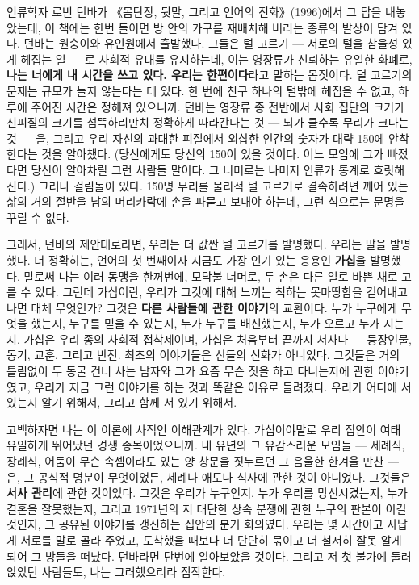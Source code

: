 인류학자 로빈 던바가 《몸단장, 뒷말, 그리고 언어의 진화》(1996)에서 그 답을 내놓았는데, 이 책에는 한번 들이면 방 안의 가구를 재배치해 버리는 종류의 발상이 담겨 있다. 던바는 원숭이와 유인원에서 출발했다. 그들은 털 고르기 — 서로의 털을 참을성 있게 헤집는 일 — 로 사회적 유대를 유지하는데, 이는 영장류가 신뢰하는 유일한 화폐로, \textbf{나는 너에게 내 시간을 쓰고 있다. 우리는 한편이다}라고 말하는 몸짓이다. 털 고르기의 문제는 규모가 늘지 않는다는 데 있다. 한 번에 친구 하나의 털밖에 헤집을 수 없고, 하루에 주어진 시간은 정해져 있으니까. 던바는 영장류 종 전반에서 사회 집단의 크기가 신피질의 크기를 섬뜩하리만치 정확하게 따라간다는 것 — 뇌가 클수록 무리가 크다는 것 — 을, 그리고 우리 자신의 과대한 피질에서 외삽한 인간의 숫자가 대략 150에 안착한다는 것을 알아챘다. (당신에게도 당신의 150이 있을 것이다. 어느 모임에 그가 빠졌다면 당신이 알아차릴 그런 사람들 말이다. 그 너머로는 나머지 인류가 통계로 흐릿해진다.) 그러나 걸림돌이 있다. 150명 무리를 물리적 털 고르기로 결속하려면 깨어 있는 삶의 거의 절반을 남의 머리카락에 손을 파묻고 보내야 하는데, 그런 식으로는 문명을 꾸릴 수 없다.

그래서, 던바의 제안대로라면, 우리는 더 값싼 털 고르기를 발명했다. 우리는 말을 발명했다. 더 정확히는, 언어의 첫 번째이자 지금도 가장 인기 있는 응용인 \textbf{가십}을 발명했다. 말로써 나는 여러 동맹을 한꺼번에, 모닥불 너머로, 두 손은 다른 일로 바쁜 채로 고를 수 있다. 그런데 가십이란, 우리가 그것에 대해 느끼는 척하는 못마땅함을 걷어내고 나면 대체 무엇인가? 그것은 \textbf{다른 사람들에 관한 이야기}의 교환이다. 누가 누구에게 무엇을 했는지, 누구를 믿을 수 있는지, 누가 누구를 배신했는지, 누가 오르고 누가 지는지. 가십은 우리 종의 사회적 접착제이며, 가십은 처음부터 끝까지 서사다 — 등장인물, 동기, 교훈, 그리고 반전. 최초의 이야기들은 신들의 신화가 아니었다. 그것들은 거의 틀림없이 두 동굴 건너 사는 남자와 그가 요즘 무슨 짓을 하고 다니는지에 관한 이야기였고, 우리가 지금 그런 이야기를 하는 것과 똑같은 이유로 들려졌다. 우리가 어디에 서 있는지 알기 위해서, 그리고 함께 서 있기 위해서.

고백하자면 나는 이 이론에 사적인 이해관계가 있다. 가십이야말로 우리 집안이 여태 유일하게 뛰어났던 경쟁 종목이었으니까. 내 유년의 그 유감스러운 모임들 — 세례식, 장례식, 어둠이 무슨 속셈이라도 있는 양 창문을 짓누르던 그 음울한 한겨울 만찬 — 은, 그 공식적 명분이 무엇이었든, 세례나 애도나 식사에 관한 것이 아니었다. 그것들은 \textbf{서사 관리}에 관한 것이었다. 그것은 우리가 누구인지, 누가 우리를 망신시켰는지, 누가 결혼을 잘못했는지, 그리고 1971년의 저 대단한 상속 분쟁에 관한 누구의 판본이 이길 것인지, 그 공유된 이야기를 갱신하는 집안의 분기 회의였다. 우리는 몇 시간이고 사납게 서로를 말로 골라 주었고, 도착했을 때보다 더 단단히 묶이고 더 철저히 잘못 알게 되어 그 방들을 떠났다. 던바라면 단번에 알아보았을 것이다. 그리고 저 첫 불가에 둘러앉았던 사람들도, 나는 그러했으리라 짐작한다.

